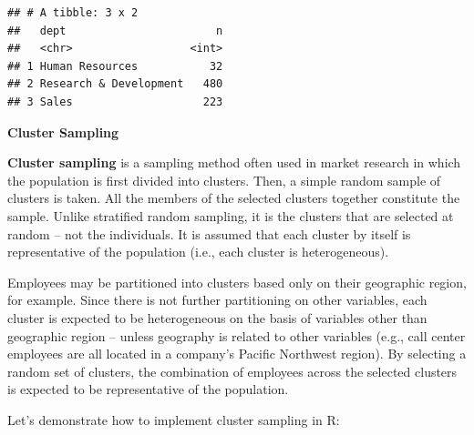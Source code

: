 \documentclass[
]{book}
\newenvironment{Shaded}{\begin{snugshade}}{\end{snugshade}}
\newcommand{\AttributeTok}[1]{\textcolor[rgb]{0.77,0.63,0.00}{#1}}
\newcommand{\CommentTok}[1]{\textcolor[rgb]{0.56,0.35,0.01}{\textit{#1}}}
\newcommand{\DecValTok}[1]{\textcolor[rgb]{0.00,0.00,0.81}{#1}}
\newcommand{\FunctionTok}[1]{\textcolor[rgb]{0.00,0.00,0.00}{#1}}
\newcommand{\NormalTok}[1]{#1}
\newcommand{\OtherTok}[1]{\textcolor[rgb]{0.56,0.35,0.01}{#1}}
\newcommand{\SpecialCharTok}[1]{\textcolor[rgb]{0.00,0.00,0.00}{#1}}
\begin{document}
\begin{verbatim}
## # A tibble: 3 x 2
##   dept                       n
##   <chr>                  <int>
## 1 Human Resources           32
## 2 Research & Development   480
## 3 Sales                    223
\end{verbatim}

\textbf{Cluster Sampling}

\textbf{Cluster sampling} is a sampling method often used in market research in which the population is first divided into clusters. Then, a simple random sample of clusters is taken. All the members of the selected clusters together constitute the sample. Unlike stratified random sampling, it is the clusters that are selected at random -- not the individuals. It is assumed that each cluster by itself is representative of the population (i.e., each cluster is heterogeneous).

Employees may be partitioned into clusters based only on their geographic region, for example. Since there is not further partitioning on other variables, each cluster is expected to be heterogeneous on the basis of variables other than geographic region -- unless geography is related to other variables (e.g., call center employees are all located in a company's Pacific Northwest region). By selecting a random set of clusters, the combination of employees across the selected clusters is expected to be representative of the population.

Let's demonstrate how to implement cluster sampling in R:

\begin{Shaded}
\end{Shaded}
\end{document}
